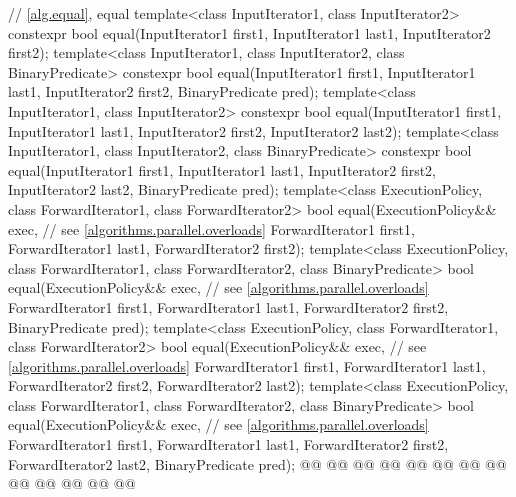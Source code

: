 \begin{codeblock}
{  // \ref{alg.equal}, equal
  template<class InputIterator1, class InputIterator2>
    constexpr bool equal(InputIterator1 first1, InputIterator1 last1,
                         InputIterator2 first2);
  template<class InputIterator1, class InputIterator2, class BinaryPredicate>
    constexpr bool equal(InputIterator1 first1, InputIterator1 last1,
                         InputIterator2 first2, BinaryPredicate pred);
  template<class InputIterator1, class InputIterator2>
    constexpr bool equal(InputIterator1 first1, InputIterator1 last1,
                         InputIterator2 first2, InputIterator2 last2);
  template<class InputIterator1, class InputIterator2, class BinaryPredicate>
    constexpr bool equal(InputIterator1 first1, InputIterator1 last1,
                         InputIterator2 first2, InputIterator2 last2,
                         BinaryPredicate pred);
  template<class ExecutionPolicy, class ForwardIterator1, class ForwardIterator2>
    bool equal(ExecutionPolicy&& exec, // see \ref{algorithms.parallel.overloads}
               ForwardIterator1 first1, ForwardIterator1 last1,
               ForwardIterator2 first2);
  template<class ExecutionPolicy, class ForwardIterator1, class ForwardIterator2,
           class BinaryPredicate>
    bool equal(ExecutionPolicy&& exec, // see \ref{algorithms.parallel.overloads}
               ForwardIterator1 first1, ForwardIterator1 last1,
               ForwardIterator2 first2, BinaryPredicate pred);
  template<class ExecutionPolicy, class ForwardIterator1, class ForwardIterator2>
    bool equal(ExecutionPolicy&& exec, // see \ref{algorithms.parallel.overloads}
               ForwardIterator1 first1, ForwardIterator1 last1,
               ForwardIterator2 first2, ForwardIterator2 last2);
  template<class ExecutionPolicy, class ForwardIterator1, class ForwardIterator2,
           class BinaryPredicate>
    bool equal(ExecutionPolicy&& exec, // see \ref{algorithms.parallel.overloads}
               ForwardIterator1 first1, ForwardIterator1 last1,
               ForwardIterator2 first2, ForwardIterator2 last2,
               BinaryPredicate pred);
  @@
    @@
        @@
      @@
      @@
                @@
                @@
    @@
        @@
      @@
      @@
                @@
  @\added{\}}@

}
\end{codeblock}
